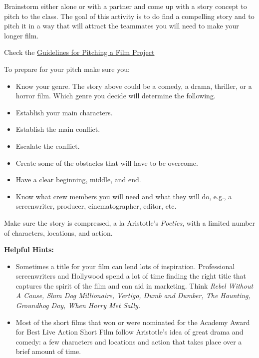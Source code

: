 \documentclass[
]{book}
\providecommand{\tightlist}{%
  \setlength{\itemsep}{0pt}\setlength{\parskip}{0pt}}
\begin{document}
\begin{reflect}
Brainstorm either alone or with a partner and come up with a story concept to pitch to the class. The goal of this activity is to do find a compelling story and to pitch it in a way that will attract the teammates you will need to make your longer film.

Check the \href{assets/unit8/Guidelines_for_fairytale_template_for_a_short_film.pdf}{Guidelines for Pitching a Film Project}

To prepare for your pitch make sure you:

\begin{itemize}
\tightlist
\item
  Know your genre. The story above could be a comedy, a drama, thriller, or a horror film. Which genre you decide will determine the following.\\
\item
  Establish your main characters.\\
\item
  Establish the main conflict.\\
\item
  Escalate the conflict.\\
\item
  Create some of the obstacles that will have to be overcome.\\
\item
  Have a clear beginning, middle, and end.\\
\item
  Know what crew members you will need and what they will do, e.g., a screenwriter, producer, cinematographer, editor, etc.
\end{itemize}

Make sure the story is compressed, a la Aristotle's \emph{Poetics}, with a limited number of characters, locations, and action.

\textbf{Helpful Hints:}

\begin{itemize}
\tightlist
\item
  Sometimes a title for your film can lend lots of inspiration. Professional screenwriters and Hollywood spend a lot of time finding the right title that captures the spirit of the film and can aid in marketing. Think \emph{Rebel Without A Cause, Slum Dog Millionaire, Vertigo, Dumb and Dumber, The Haunting, Groundhog Day, When Harry Met Sally.}
\item
  Most of the short films that won or were nominated for the Academy Award for Best Live Action Short Film follow Aristotle's idea of great drama and comedy: a few characters and locations and action that takes place over a brief amount of time.
\end{itemize}
\end{reflect}
\end{document}
